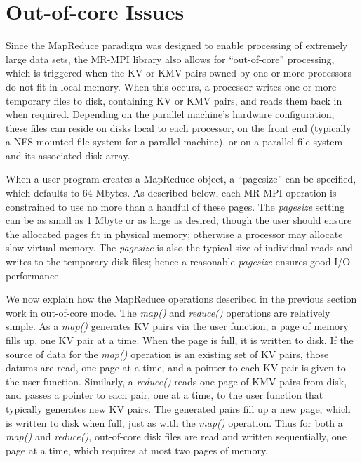 \section{Out-of-core Issues}
\label{sec:outcore}

Since the MapReduce paradigm was designed to enable processing of
extremely large data sets, the MR-MPI library also allows for
``out-of-core'' processing, which is triggered when the KV or KMV
pairs owned by one or more processors do not fit in local memory.
When this occurs, a processor writes one or more temporary files to
disk, containing KV or KMV pairs, and reads them back in when
required.  Depending on the parallel machine's hardware configuration,
these files can reside on disks local to each processor, on the front
end (typically a NFS-mounted file system for a parallel machine), or
on a parallel file system and its associated disk array.

When a user program creates a MapReduce object, a ``pagesize'' can be
specified, which defaults to 64 Mbytes.  As described below, each
MR-MPI operation is constrained to use no more than a handful of these
pages.  The {\it pagesize} setting can be as small as 1 Mbyte or as
large as desired, though the user should ensure the allocated pages
fit in physical memory; otherwise a processor may allocate slow
virtual memory.  The {\it pagesize} is also the typical size of
individual reads and writes to the temporary disk files; hence a
reasonable {\it pagesize} ensures good I/O performance.

We now explain how the MapReduce operations described in the previous
section work in out-of-core mode.  The {\it map()} and {\it reduce()}
operations are relatively simple.  As a {\it map()} generates KV pairs
via the user function, a page of memory fills up, one KV pair at a
time.  When the page is full, it is written to disk.  If the source of
data for the {\it map()} operation is an existing set of KV pairs,
those datums are read, one page at a time, and a pointer to each KV
pair is given to the user function.  Similarly, a {\it reduce()} reads
one page of KMV pairs from disk, and passes a pointer to each pair,
one at a time, to the user function that typically generates new KV
pairs.  The generated pairs fill up a new page, which is written to
disk when full, just as with the {\it map()} operation.  Thus for both
a {\it map()} and {\it reduce()}, out-of-core disk files are read and
written sequentially, one page at a time, which requires at most two
pages of memory.

